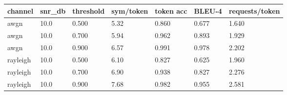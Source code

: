 \begin{tabular}{lllllll}
\hline
channel & snr\_db & threshold & sym/token & token acc & BLEU-4 & requests/token \\
\hline
awgn & 10.0 & 0.500 & 5.32 & 0.860 & 0.677 & 1.640 \\
awgn & 10.0 & 0.700 & 5.94 & 0.962 & 0.893 & 1.929 \\
awgn & 10.0 & 0.900 & 6.57 & 0.991 & 0.978 & 2.202 \\
rayleigh & 10.0 & 0.500 & 6.10 & 0.827 & 0.625 & 1.960 \\
rayleigh & 10.0 & 0.700 & 6.90 & 0.938 & 0.827 & 2.276 \\
rayleigh & 10.0 & 0.900 & 7.68 & 0.982 & 0.955 & 2.581 \\
\hline
\end{tabular}
